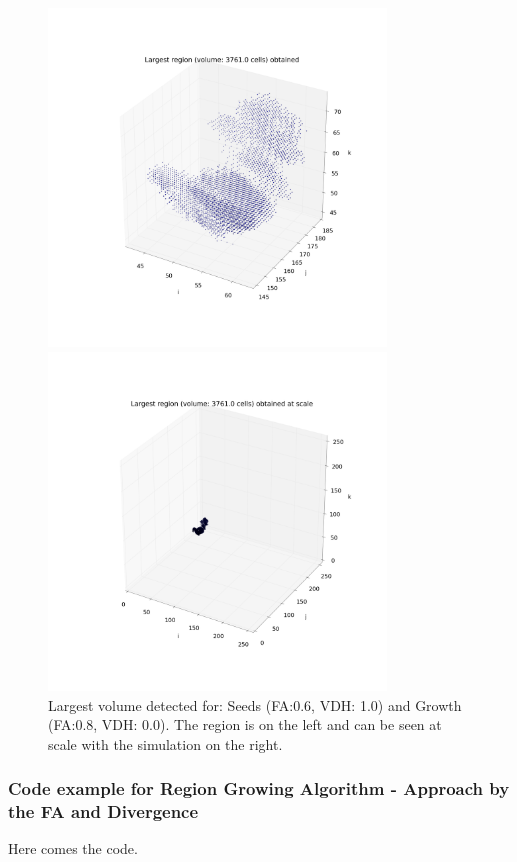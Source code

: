 \documentclass[12pt]{article}
\begin{document}
\begin{figure}[ht]
\centering
\begin{minipage}{.5\textwidth}
  \centering
  \includegraphics[width=0.8\textwidth]{groups/firstimplementation/largest_vol_24_seeds_129.png} %
\end{minipage}%
\begin{minipage}{.5\textwidth}
  \centering
  \includegraphics[width=0.8\textwidth]{groups/firstimplementation/largest_vol_24_seeds_129_scale.png}
  \end{minipage}
\caption{Largest volume detected for: Seeds (FA:0.6, VDH: 1.0) and Growth (FA:0.8, VDH: 0.0). The region is on the left and can be seen at scale with the simulation on the right.}
\label{fg:first_3D_largest}
\end{figure}
\FloatBarrier
\subsubsection{Code example for Region Growing Algorithm - Approach by the FA and Divergence}
\label{App:own_impl_code}
\tiny
Here comes the code.
\end{document}
